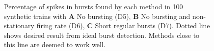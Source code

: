 \documentclass[12pt, titlepage]{article}
\begin{document}
		\begin{figure}[h]
			\centering
			\caption{Percentage of spikes in bursts found by each method in 100 synthetic trains with \textbf{A} No bursting (D5), \textbf{B}  No bursting and non-stationary firing rate (D6), \textbf{C} Short regular bursts (D7). Dotted line shows desired result from ideal burst detection. Methods close to this line are deemed to work well.}
			\label{sim_results1}
		\end{figure}
\end{document}
